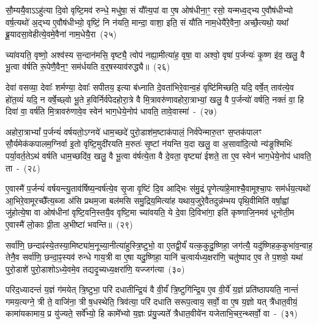 सौ॒म्ययै॒वा\-ऽऽ\-हु॑त्या दि॒वो वृष्टि॒मव॑ रुन्धे॒ मधु॑षा॒ सं यौ᳚त्य॒पां वा ए॒ष ओष॑धीना॒ꣳ॒ रसो॒ यन्मध्व॒द्भ्य ए॒वौष॑धीभ्यो वर्\mbox{}ष॒त्यथो॑ अ॒द्भ्य ए॒वौष॑धीभ्यो॒ वृष्टिं॒ नि न॑यति॒ मान्दा॒ वाशा॒ इति॒ सं यौ॑ति नाम॒धेयै॑रे॒वैना॒ अच्छै॒त्यथो॒ यथा᳚ ब्रू॒यादसा॒वेहीत्ये॒वमे॒वैना॑ नाम॒धेयै॒रा~(२५)\ip

च्या॑वयति॒ वृष्णो॒ अश्व॑स्य स॒न्दान॑मसि॒ वृष्ट्यै॒ त्वोप॑ नह्या॒मीत्या॑ह॒ वृषा॒ वा अश्वो॒ वृषा॑ प॒र्जन्यः॑ कृ॒ष्ण इ॑व॒ खलु॒ वै भू॒त्वा व॑र्\mbox{}षति रू॒पेणै॒वैन॒ꣳ॒ सम॑र्धयति व॒र्॒\mbox{}षस्याव॑रुद्ध्यै॥~(२६)\ip

{\anuvakamend[{अ॒ष्टौ भव॑न्ति नाम॒धेयै॒रैका॒न्नत्रि॒ꣳ॒शच्च॑}]}

देवा॑ वसव्या॒ देवाः᳚ शर्मण्या॒ देवाः᳚ सपीतय॒ इत्या ब॑ध्नाति दे॒वता॑भिरे॒वान्व॒हं वृष्टि॑मिच्छति॒ यदि॒ वर्\mbox{}षे॒त् ताव॑त्ये॒व हो॑त॒व्यं॑ यदि॒ न वर्\mbox{}षे॒च्छ्वो भू॒ते ह॒विर्निर्व॑पेदहोरा॒त्रे वै मि॒त्रावरु॑णावहोरा॒त्राभ्यां॒ खलु॒ वै प॒र्जन्यो॑ वर्\mbox{}षति॒ नक्तं॑ वा॒ हि दिवा॑ वा॒ वर्\mbox{}ष॑ति मि॒त्रावरु॑णावे॒व स्वेन॑ भाग॒धेये॒नोप॑ धावति॒ तावे॒वास्मा॑~-~(२७)\ip

अहोरा॒त्रा\-भ्यां᳚ प॒र्जन्यं॑ वर्\mbox{}षयतो॒\-ऽग्नये॑ धाम॒च्छदे॑ पुरो॒डाश॑\-म॒ष्टा\-क॑पालं॒ निर्व॑पेन्मारु॒तꣳ स॒प्तक॑पालꣳ सौ॒र्यमेक॑कपालम॒ग्निर्वा इ॒तो वृष्टि॒मुदी॑रयति म॒रुतः॑ सृ॒ष्टां न॑यन्ति य॒दा खलु॒ वा अ॒सावा॑दि॒त्यो न्य॑ङ्र॒श्मिभिः॑ पर्या॒वर्त॒ते\-ऽथ॑ वर्\mbox{}षति धाम॒च्छदि॑व॒ खलु॒ वै भू॒त्वा व॑र्\mbox{}षत्ये॒ता वै दे॒वता॒ वृष्ट्या॑ ईशते॒ ता ए॒व स्वेन॑ भाग॒धेये॒नोप॑ धावति॒ ता~-~(२८)\ip

ए॒वास्मै॑ प॒र्जन्यं॑ वर्\mbox{}षयन्त्यु॒ताव॑र्\mbox{}षिष्य॒न्वर्\mbox{}ष॑त्ये॒व सृ॒जा वृ॒ष्टिं दि॒व आद्भिः स॑मु॒द्रं पृ॒णेत्या॑हे॒माश्चै॒वामूश्चा॒पः सम॑र्धय॒त्यथो॑ आ॒भिरे॒वामूरच्छै᳚त्य॒ब्जा अ॑सि प्रथम॒जा बल॑मसि समु॒द्रिय॒मित्या॑ह यथाय॒जुरे॒वैतदुन्न॑म्भय पृथि॒वीमिति॑ वर्\mbox{}षा॒ह्वां जु॑होत्ये॒षा वा ओष॑धीनां वृष्टि॒वनि॒स्तयै॒व वृष्टि॒मा च्या॑वयति॒ ये दे॒वा दि॒विभा॑गा॒ इति॑ कृष्णाजि॒नमव॑ धूनोती॒म ए॒वास्मै॑ लो॒काः प्री॒ता अ॒भीष्टा॑ भवन्ति॥~(२९)\ip

{\anuvakamend[{अ॒स्मै॒ धा॒व॒ति॒ ता वा एक॑विꣳशतिश्च}]}%

सर्वा॑णि॒ छन्दाꣴ॑स्ये॒तस्या॒मिष्ट्या॑म॒नूच्या॒नीत्या॑हुस्त्रि॒ष्टुभो॒ वा ए॒तद्वी॒र्यं॑ यत्क॒कुदु॒ष्णिहा॒ जग॑त्यै॒ यदु॑ष्णिहक॒कुभा॑व॒न्वाह॒ तेनै॒व सर्वा॑णि॒ छन्दा॒ꣴ॒स्यव॑ रुन्धे गाय॒त्री वा ए॒षा यदु॒ष्णिहा॒ यानि॑ च॒त्वार्यध्य॒क्षरा॑णि॒ चतु॑ष्पाद ए॒व ते प॒शवो॒ यथा॑ पुरो॒डाशे॑ पुरो॒डाशो\-ऽध्ये॒वमे॒व तद्यदृ॒च्यध्य॒क्षरा॑णि॒ यज्जग॑त्या~(३०)\ip

परिद॒ध्यादन्तं॑ य॒ज्ञं ग॑मयेत् त्रि॒ष्टुभा॒ परि॑ दधातीन्द्रि॒यं वै वी॒र्यं॑ त्रि॒ष्टुगि॑न्द्रि॒य ए॒व वी॒र्ये॑ य॒ज्ञं प्रति॑\-ष्ठापयति॒ नान्तं॑ गमय॒त्यग्ने॒ त्री ते॒ वाजि॑ना॒ त्री ष॒धस्थेति॒ त्रिव॑त्या॒ परि॑ दधाति सरूप॒त्वाय॒ सर्वो॒ वा ए॒ष य॒ज्ञो यत् त्रै॑धात॒वीयं॒ कामा॑यकामाय॒ प्र यु॑ज्यते॒ सर्वे᳚भ्यो॒ हि कामे᳚भ्यो य॒ज्ञः प्र॑यु॒ज्यते᳚ त्रैधात॒वीये॑न यजेताभि॒चर॒न्थ्सर्वो॒ \mbox{वा~-~(३१)\ip}

